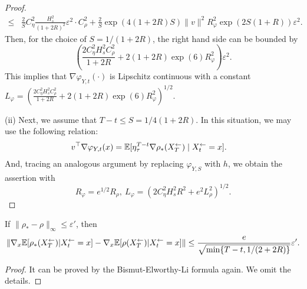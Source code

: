 \begin{proof}
\begin{align}
\leq & 
\frac{2}{S} C_\eta^2  \frac{H_s^2}{(1 + 2R)^2} \varepsilon^2 \cdot C_\rho^2 
 + \frac{2}{S}  
 \exp(4(1+2R)S) \|v\|^2 
  R_\varphi^2 \exp(2 S(1+R)) \varepsilon^2.
\end{align}
Then, for the choice of $S = 1/(1+2R)$, the right hand side can be bounded by 
$$
\left( \frac{2 C_\eta^2 H_s^2 C_\rho^2}{1+2R} + 
2 (1 + 2R) \exp(6) R_\varphi^2 \right) 
\varepsilon^2. 
$$
This implies that $\nabla \varphi_{Y,t}(\cdot)$ is Lipschitz continuous with a constant $L_\varphi = \left( \frac{2 C_\eta^2 H_s^2 C_\rho^2}{1+2R} + 
2 (1 + 2R) \exp(6)R_\varphi^2 \right)^{1/2}$. 

(ii) Next, we assume that $T - t \leq S = 1/4(1 + 2R)$. 
In this situation, we may use the following relation: 
\begin{align} 
& v^\top \nabla \varphi_{Y,t}(x)  = \mathbb{E}[\eta_\tau^{T-t} \nabla \rho_*({X}_{T}^\leftarrow) \mid {X}_{t}^\leftarrow = x]. 
\end{align}
And, tracing an analogous argument by replacing $\varphi_{Y,S}$ with $h$, we obtain the assertion with 
$$
R_\varphi = e^{1/2} R_\rho,~L_\varphi = \left(2 C_\eta^2 H_s^2 R^2 + e^2 L_\rho^2 \right)^{1/2}.
$$
\end{proof}


\begin{lem}\label{lem:hhdashDiff}
If $\|\rho_* - \rho\|_\infty \leq \varepsilon'$, then %
 $$\|\nabla_x \mathbb{E}[\rho_*({X}_{T}^\leftarrow) | {X}_{t}^\leftarrow = x] - 
 \nabla_x \mathbb{E}[\rho({X}_{T}^\leftarrow)  | {X}_{t}^\leftarrow = x] \| \leq 
 \frac{e}{\sqrt{\min\{T-t,1/(2+2R)\}}} \varepsilon'.$$   
\end{lem}
\begin{proof}
It can be proved by the Bismut-Elworthy-Li formula again. We omit the details. 
\end{proof}

